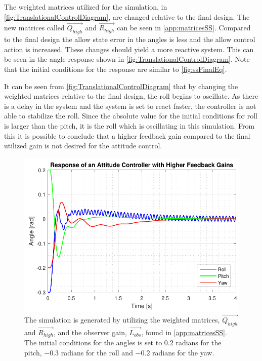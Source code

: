 The weighted matrices utilized for the simulation, in \autoref{fig:TranslationalControlDiagram}, are changed relative to the final design. The new matrices called $\vec{Q_{high}}$ and $\vec{R_{high}}$ can be seen in \autoref{app:matricesSS}. Compared to the final design the allow state error in the angles is less and the allow control action is increased. These changes should yield a more reactive system. This can be seen in the angle response shown in \autoref{fig:TranslationalControlDiagram}. Note that the initial conditions for the response are similar to \autoref{fig:ssFinalEq}.

It can be seen from \autoref{fig:TranslationalControlDiagram} that by changing the weighted matrices relative to the final design, the roll begins to oscillate. As there is a delay in the system and the system is set to react faster, the controller is not able to stabilize the roll. Since the absolute value for the initial conditions for roll is larger than the pitch, it is the roll which is oscillating in this simulation. From this it is possible to conclude that a higher feedback gain compared to the final utilized gain is not desired for the attitude control.
%
\begin{figure}[H]
	\centering
	\includegraphics[scale=1]{figures/ssEqBad.pdf}
	\caption{The simulation is generated by utilizing the weighted matrices, $\vec{Q_{high}}$ and $\vec{R_{high}}$, and the observer gain, $\vec{L_{obs}}$, found in \autoref{app:matricesSS}. The initial conditions for the angles is set to $0.2$ radians for the pitch, $-0.3$ radians for the roll and $-0.2$ radians for the yaw.}
	\label{fig:TranslationalControlDiagram}
\end{figure}
